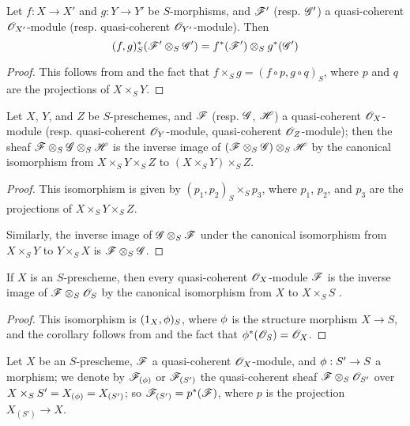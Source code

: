 \begin{corollary}[9.1.5]
\label{I.9.1.5}
Let $f:X\to X'$ and $g:Y\to Y'$ be
$S$-morphisms, and $\mathscr{F}'$ (resp. $\mathscr{G}'$) a quasi-coherent
$\mathscr{O}_{X'}$-module (resp. quasi-coherent $\mathscr{O}_{Y'}$-module). Then
\[
  (f,g)^*_S(\mathscr{F}'\otimes_S\mathscr{G}')=f^*(\mathscr{F}')\otimes_S g^*(\mathscr{G}')
\]
\end{corollary}

\begin{proof}
This follows from  and the fact that $f\times_S g=(f\circ p, g\circ q)_S$,
where $p$ and $q$ are the projections of $X\times_S Y$.
\end{proof}

\begin{corollary}[9.1.6]
\label{I.9.1.6}
Let $X$, $Y$, and $Z$ be $S$-preschemes, and $\mathscr{F}$ (resp. $\mathscr{G}$, $\mathscr{H}$) a
quasi-coherent $\mathscr{O}_X$-module (resp. quasi-coherent $\mathscr{O}_Y$-module, quasi-coherent
$\mathscr{O}_Z$-module); then the sheaf $\mathscr{F}\otimes_S\mathscr{G}\otimes_S\mathscr{H}$ is the inverse image
of $(\mathscr{F}\otimes_S\mathscr{G})\otimes_S\mathscr{H}$ by the canonical isomorphism from
$X\times_S Y\times_S Z$ to $(X\times_S Y)\times_S Z$.
\end{corollary}

\begin{proof}
This isomorphism is given by $(p_1,p_2)_S\times_S p_3$, where $p_1$, $p_2$, and $p_3$
are the projections of $X\times_S Y\times_S Z$.

Similarly, the inverse image of $\mathscr{G}\otimes_S\mathscr{F}$ under the canonical isomorphism from
$X\times_S Y$ to $Y\times_S X$ is $\mathscr{F}\otimes_S\mathscr{G}$.
\end{proof}

\begin{corollary}[9.1.7]
\label{I.9.1.7}
If $X$ is an $S$-prescheme, then every quasi-coherent $\mathscr{O}_X$-module $\mathscr{F}$ is the inverse
image of $\mathscr{F}\otimes_S\mathscr{O}_S$ by the canonical isomorphism from $X$ to $X\times_S S$
.
\end{corollary}

\begin{proof}
This isomorphism is $(1_X,\phi)_S$, where $\phi$ is the structure morphism
$X\to S$, and the corollary follows from  and the fact that
$\phi^*(\mathscr{O}_S)=\mathscr{O}_X$.
\end{proof}

\begin{env}[9.1.8]
\label{I.9.1.8}
Let $X$ be an $S$-prescheme, $\mathscr{F}$ a quasi-coherent
$\mathscr{O}_X$-module, and $\vphi:S'\to S$ a morphism; we denote by
$\mathscr{F}_{(\phi)}$ or $\mathscr{F}_{(S')}$ the quasi-coherent sheaf
$\mathscr{F}\otimes_S\mathscr{O}_{S'}$ over $X\times_S S'=X_{(\phi)}=X_{(S')}$; so
$\mathscr{F}_{(S')}=p^*(\mathscr{F})$, where $p$ is the projection $X_{(S')}\to X$.
\end{env}


